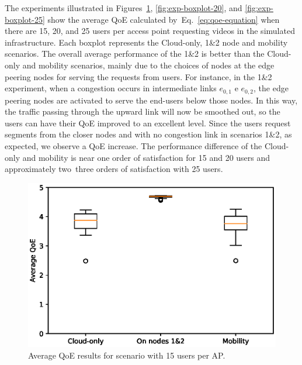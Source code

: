 The experiments illustrated in Figures~\ref{fig:exp-boxplot-15}, \ref{fig:exp-boxplot-20}, and \ref{fig:exp-boxplot-25} show the average QoE calculated by~Eq.~\ref{eq:qoe-equation} when there are 15, 20, and 25 users per access point requesting videos in the simulated infrastructure. Each boxplot represents the Cloud-only, 1\&2 node and mobility scenarios. The overall average performance of the 1\&2 is better than the Cloud-only and mobility scenarios, mainly due to the choices of nodes at the edge peering nodes for serving the requests from users. 
%
For instance, in the 1\&2 experiment, when a congestion occurs in intermediate links $e_{0,1}$ e $e_{0,2}$, the edge peering nodes are activated to serve the end-users below those nodes. In this way, the traffic passing through the upward link  will now be smoothed out, so the users can have their QoE improved to an excellent level.
%
Since the users request segments from the closer nodes and with no congestion link in scenarios 1\&2, as expected, we observe a QoE increase. %
%
The performance difference of the Cloud-only and mobility is near one order of satisfaction for 15 and 20 users and approximately two~three orders of satisfaction with 25 users.


\begin{figure}[!h]
    \centering
    \includegraphics[width=\linewidth]{images/QoEBoxplot-15u.eps}
    \vspace{-0.9cm}
    \caption{Average QoE results for scenario with 15 users per AP.}
    \label{fig:exp-boxplot-15}
\end{figure}

